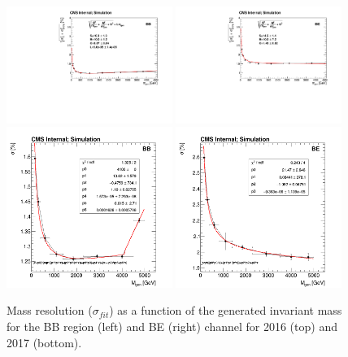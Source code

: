 \begin{figure}[ht]
\centering
\includegraphics[width=0.48\textwidth]{figures/Zprime/2016/mass_resolution/resolution_BB.pdf}
\includegraphics[width=0.48\textwidth]{figures/Zprime/2016/mass_resolution/resolution_BE.pdf}
\includegraphics[width=0.48\textwidth]{figures/Zprime/2017/mass_resolution/High_Mass/BB_sigma}
\includegraphics[width=0.48\textwidth]{figures/Zprime/2017/mass_resolution/High_Mass/BE_sigma}
\caption{Mass resolution ($\sigma_{fit}$) as a function of the generated invariant mass for the BB region (left) and BE (right) channel for 2016 (top) and 2017 (bottom).
 \label{fig:resolution}}
\end{figure}

